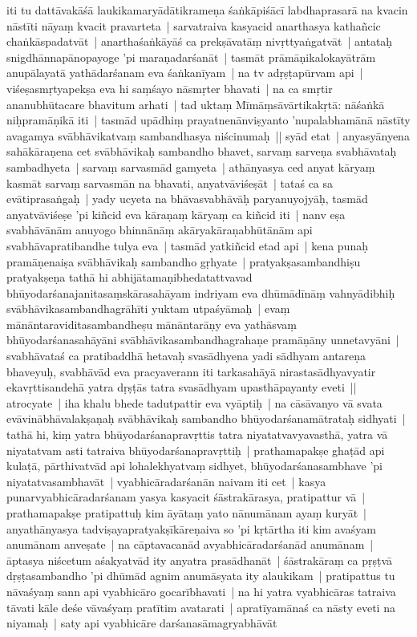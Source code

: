 \documentclass[article,a4paper]{memoir}
\begin{document}
	  \pstart iti tu dattā\-vakā\-śā\- laukikamaryā\-dā\-tikrameṇa śaṅkā\-piśā\-cī\- labdhaprasarā\- na kvacin nā\-stī\-ti nā\-yaṃ kvacit pravarteta | sarvatraiva kasyacid anarthasya kathañcic chaṅkā\-spadatvā\-t | anarthaśaṅkā\-yā\-ś ca prekṣā\-vatā\-ṃ nivṛttyaṅgatvā\-t | antataḥ snigdhā\-nnapā\-nopayoge 'pi maraṇadarśanā\-t | tasmā\-t prā\-mā\-ṇikalokayā\-trā\-m anupā\-layatā\- yathā\-darśanam eva śaṅkanī\-yam | na tv adṛṣṭapū\-rvam api | viśeṣasmṛtyapekṣa eva hi saṃśayo nā\-smṛter bhavati | na ca smṛtir ananubhū\-tacare bhavitum arhati | tad uktaṃ Mī\-mā\-ṃsā\-vā\-rtikakṛtā\-: nā\-śaṅkā\- niḥpramā\-ṇikā\- iti | tasmā\-d upā\-dhiṃ prayatnenā\-nviṣyanto 'nupalabhamā\-nā\- nā\-stī\-ty avagamya svā\-bhā\-vikatvaṃ sambandhasya niścinumaḥ || \label{thakur75-107.16} syā\-d etat | anyasyā\-nyena sahā\-kā\-raṇena cet svā\-bhā\-vikaḥ sambandho bhavet, sarvaṃ sarveṇa svabhā\-vataḥ sambadhyeta | sarvaṃ sarvasmā\-d gamyeta | athā\-nyasya ced anyat kā\-ryaṃ kasmā\-t sarvaṃ sarvasmā\-n na bhavati, anyatvā\-viśeṣā\-t | tataś ca sa evā\-tiprasaṅgaḥ | yady ucyeta na bhā\-vasvabhā\-vā\-ḥ paryanuyojyā\-ḥ, tasmā\-d anyatvā\-viśeṣe 'pi kiñcid eva kā\-raṇaṃ kā\-ryaṃ ca kiñcid iti | nanv eṣa svabhā\-vā\-nā\-m anuyogo bhinnā\-nā\-ṃ akā\-ryakā\-raṇabhū\-tā\-nā\-m api svabhā\-vapratibandhe tulya eva | tasmā\-d yatkiñcid etad api | kena punaḥ pramā\-ṇenaiṣa svā\-bhā\-vikaḥ sambandho gṛhyate | pratyakṣasambandhiṣu pratyakṣeṇa tathā\- hi abhijā\-tamaṇibhedatattvavad bhū\-yodarśanajanitasaṃskā\-rasahā\-yam indriyam eva dhū\-mā\-dī\-nā\-ṃ vahnyā\-dibhiḥ svā\-bhā\-vikasambandhagrā\-hī\-ti yuktam utpaśyā\-maḥ | evaṃ mā\-nā\-ntaraviditasambandheṣu mā\-nā\-ntarā\-ṇy eva yathā\-svaṃ bhū\-yodarśanasahā\-yā\-ni svā\-bhā\-vikasambandhagrahaṇe pramā\-ṇā\-ny unnetavyā\-ni | svabhā\-vataś ca pratibaddhā\- hetavaḥ svasā\-dhyena yadi sā\-dhyam antareṇa bhaveyuḥ, svabhā\-vā\-d eva pracyaverann iti tarkasahā\-yā\- nirastasā\-dhyavyatir ekavṛttisandehā\- yatra dṛṣṭā\-s tatra svasā\-dhyam upasthā\-payanty eveti || \label{thakur75-108.3} atrocyate | iha khalu bhede tadutpattir eva vyā\-ptiḥ | na cā\-sā\-vanyo vā\- svata evā\-vinā\-bhā\-valakṣaṇaḥ svā\-bhā\-vikaḥ sambandho bhū\-yodarśanamā\-trataḥ sidhyati | tathā\- hi, kiṃ yatra bhū\-yodarśanapravṛttis tatra niyatatvavyavasthā\-, yatra vā\- niyatatvam asti tatraiva bhū\-yodarśanapravṛttiḥ | prathamapakṣe ghaṭā\-d api kulaṭā\-, pā\-rthivatvā\-d api lohalekhyatvaṃ sidhyet, bhū\-yodarśanasambhave 'pi niyatatvasambhavā\-t | \label{thakur75-108.8} vyabhicā\-radarśanā\-n naivam iti cet | kasya punarvyabhicā\-radarśanam yasya kasyacit śā\-strakā\-rasya, pratipattur vā\- | prathamapakṣe pratipattuḥ kim ā\-yā\-taṃ yato nā\-numā\-nam ayaṃ kuryā\-t | anyathā\-nyasya tadviṣayapratyakṣī\-kā\-reṇaiva so 'pi kṛtā\-rtha iti kim avaśyam anumā\-nam anveṣate | na cā\-ptavacanā\-d avyabhicā\-radarśanā\-d anumā\-nam | ā\-ptasya niścetum aśakyatvā\-d ity anyatra prasā\-dhanā\-t | śā\-strakā\-raṃ ca pṛṣṭvā\- dṛṣṭasambandho 'pi dhū\-mā\-d agnim anumā\-syata ity alaukikam | pratipattus tu nā\-vaśyaṃ sann api vyabhicā\-ro gocarī\-bhavati | na hi yatra vyabhicā\-ras tatraiva tā\-vati kā\-le deśe vā\-vaśyaṃ pratī\-tim avatarati | apratī\-yamā\-naś ca nā\-sty eveti na niyamaḥ | saty api vyabhicā\-re darśanasā\-magryabhā\-vā\-t 
\end{document}
